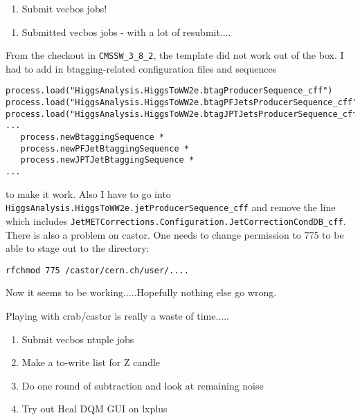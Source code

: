 

\begin{enumerate}
\item Submit vecbos jobs!
\end{enumerate}


\begin{enumerate}
\item Submitted vecbos jobs - with a lot of resubmit....
\end{enumerate}


From the checkout in \texttt{CMSSW\_3\_8\_2}, the template did not work out of the box.  I had to add in btagging-related configuration files and sequences

\begin{verbatim}
process.load("HiggsAnalysis.HiggsToWW2e.btagProducerSequence_cff")
process.load("HiggsAnalysis.HiggsToWW2e.btagPFJetsProducerSequence_cff")
process.load("HiggsAnalysis.HiggsToWW2e.btagJPTJetsProducerSequence_cff")
...
   process.newBtaggingSequence *
   process.newPFJetBtaggingSequence *
   process.newJPTJetBtaggingSequence *
...
\end{verbatim}

to make it work.  Also I have to go into \texttt{HiggsAnalysis.HiggsToWW2e.jetProducerSequence\_cff} and remove the line
which includes \texttt{JetMETCorrections.Configuration.JetCorrectionCondDB\_cff}.  There is also
a problem on castor.  One needs to change permission to 775 to be able to stage out to the directory:

\begin{verbatim}
rfchmod 775 /castor/cern.ch/user/....
\end{verbatim}

Now it seems to be working.....Hopefully nothing else go wrong.


Playing with crab/castor is really a waste of time.....


\begin{enumerate}
\item Submit vecbos ntuple jobs
\item Make a to-write list for Z candle
\item Do one round of subtraction and look at remaining noise
\item Try out Hcal DQM GUI on lxplus
\end{enumerate}


